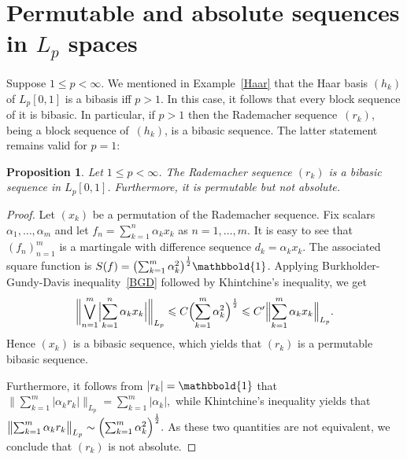 \documentclass[12pt]{amsart}
\theoremstyle{plain}
\newtheorem{proposition}[theorem]{Proposition}
\theoremstyle{definition}
\newcommand{\abs}[1]{\lvert#1\rvert}
\newcommand{\bignorm}[1]{\bigl\lVert#1\bigr\rVert}
\newcommand{\Bigabs}[1]{\Bigl\lvert#1\Bigr\rvert}
\newcommand{\Bignorm}[1]{\Bigl\lVert#1\Bigr\rVert}
\newcommand{\biggnorm}[1]{\biggl\lVert#1\biggr\rVert}
\def\one{\mathbbold{1}}
\renewcommand{\le}{\leqslant}
\begin{document}
\section{Permutable and absolute sequences in $L_p$ spaces}

Suppose $1\le p<\infty$. We mentioned in Example~\ref{Haar} that the
Haar basis $(h_k)$ of $L_p[0,1]$ is a bibasis iff $p>1$. In this case,
it follows that every block sequence of it is bibasic. In particular,
if $p>1$ then the Rademacher sequence~$(r_k)$, being a block sequence
of~$(h_k)$, is a bibasic sequence. The latter statement remains valid
for $p=1$:

\begin{proposition}\label{Rad-p-bib}
  Let $1\le p<\infty$. The Rademacher sequence $(r_k)$ is a
  bibasic sequence in $L_p[0,1]$. Furthermore, it is permutable but
  not absolute.
\end{proposition}

\begin{proof}
  Let $(x_k)$ be a permutation of the Rademacher sequence. Fix scalars
  $\alpha_1,\dots,\alpha_m$ and let $f_n=\sum_{k=1}^n\alpha_kx_k$ as
  $n=1,\dots,m$. It is easy to see that $(f_n)_{n=1}^m$ is a
  martingale with difference sequence $d_k=\alpha_kx_k$. The associated square function is
  $S(f)=\bigl(\sum_{k=1}^m\alpha_k^2\bigr)^{\frac12}\one$. Applying
  Burkholder-Gundy-Davis inequality~\eqref{BGD} followed by
  Khintchine's inequality, we get
  \begin{displaymath}
    \biggnorm{\bigvee_{n=1}^m\Bigabs{\sum_{k=1}^n\alpha_kx_k}}_{L_p}
    \le C\Bigl(\sum_{k=1}^m\alpha_k^2\Bigr)^{\frac12}
    \le C'\Bignorm{\sum_{k=1}^m\alpha_kx_k}_{L_p}.
  \end{displaymath}
  Hence $(x_k)$ is a bibasic sequence, which yields that $(r_k)$ is a
  permutable bibasic sequence.

  Furthermore, it follows from $\abs{r_k}=\one$ that
  \begin{math}
    \bignorm{\sum_{k=1}^m\abs{\alpha_kr_k}}_{L_p}=\sum_{k=1}^m\abs{\alpha_k},
  \end{math}
  while Khintchine's inequality yields that
   \begin{math}
     \bignorm{\sum_{k=1}^m\alpha_kr_k}_{L_p}
     \sim\Bigl(\sum_{k=1}^m\alpha_k^2\Bigr)^\frac12.
  \end{math} 
  As these two quantities are not equivalent, we conclude that $(r_k)$
  is not absolute.
\end{proof}
\end{document}
